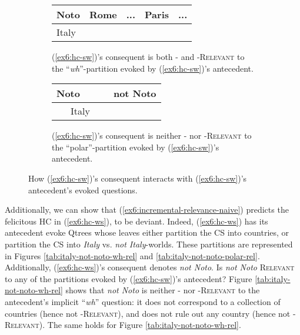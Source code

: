 \begin{figure}[H]
	\centering
	\begin{subfigure}[t]{.47\linewidth}
		\centering
		\begin{tabular}{|lll|ll}
			\hline
			\multicolumn{1}{|l|}{Noto} & \multicolumn{1}{l|}{Rome} & ... & \multicolumn{1}{l|}{Paris} & \multicolumn{1}{l|}{...} \\ \hline
			\multicolumn{3}{|l|}{\cellcolor{blue!20!white}Italy}                             & \multicolumn{2}{l}{}                                  \\ \cline{1-3}
		\end{tabular}
		\caption[]{(\ref{ex6:hc-sw})'s consequent is both \textsc{\citeauthor{Lewis1988}-} and \textsc{\citeauthor{Roberts2012}-Relevant} to the ``\textit{wh}''-partition evoked by (\ref{ex6:hc-sw})'s antecedent.}\label{tab:not-noto-italy-wh-rel}
	\end{subfigure}
	\hfill
	\begin{subfigure}[t]{.47\linewidth}
		\centering
		\begin{tabular}{|lllll}
			\hline
			\multicolumn{1}{|l|}{Noto} & \multicolumn{4}{l|}{not Noto} \\ \hline
			\multicolumn{3}{|l|}{\cellcolor{blue!20!white}~~~Italy~~~}                &       &       \\ \cline{1-3}
		\end{tabular}
		\caption[]{(\ref{ex6:hc-sw})'s consequent is neither \textsc{\citeauthor{Lewis1988}-} nor \textsc{\citeauthor{Roberts2012}-Relevant} to the ``polar''-partition evoked by (\ref{ex6:hc-sw})'s antecedent.}\label{tab:not-noto-italy-polar-rel}
	\end{subfigure}
	\caption[]{How (\ref{ex6:hc-sw})'s consequent interacts with (\ref{ex6:hc-sw})'s antecedent's evoked questions.}
\end{figure}

Additionally, we can show that (\ref{ex6:incremental-relevance-naive}) predicts the felicitous HC in (\ref{ex6:hc-ws}), to be deviant.  Indeed, (\ref{ex6:hc-ws}) has its antecedent evoke Qtrees whose leaves either partition the CS into countries, or partition the CS into \textit{Italy} vs. \textit{not Italy}-worlds. These partitions are represented in Figures \ref{tab:italy-not-noto-wh-rel} and \ref{tab:italy-not-noto-polar-rel}. Additionally, (\ref{ex6:hc-ws})'s consequent denotes \textit{not Noto}. Is \textit{not Noto} \textsc{Relevant} to any of the partitions evoked by (\ref{ex6:hc-sw})'s antecedent? Figure \ref{tab:italy-not-noto-wh-rel} shows that \textit{not Noto} is neither \textsc{\citeauthor{Lewis1988}-} nor \textsc{\citeauthor{Roberts2012}-Relevant} to the antecedent's implicit ``\textit{wh}'' question: it does not correspond to a collection of countries (hence not \textsc{\citeauthor{Lewis1988}-Relevant}), and does not rule out any country (hence not \textsc{\citeauthor{Roberts2012}-Relevant}). The same holds for Figure \ref{tab:italy-not-noto-wh-rel}.

